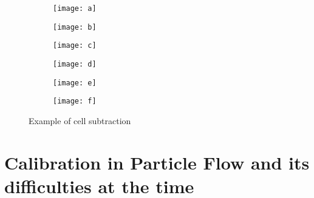\begin{figure}[htbp]
  \centering
  \begin{subfigure}[b]{0.3\figwidth}
    \texttt{[image: a]}
    \caption{}\label{fig:sub-a}
  \end{subfigure}
  \begin{subfigure}[b]{0.3\figwidth}
    \texttt{[image: b]}
    \caption{}\label{fig:sub-b}
  \end{subfigure}
  \begin{subfigure}[b]{0.3\figwidth}
    \texttt{[image: c]}
    \caption{}\label{fig:sub-c}
  \end{subfigure}
  \begin{subfigure}[b]{0.3\figwidth}
    \texttt{[image: d]}
    \caption{}\label{fig:sub-d}
  \end{subfigure}
    
    
  \begin{subfigure}[b]{0.3\figwidth}
        \texttt{[image: e]}
        \caption{}\label{fig:sub-e}
  \end{subfigure}
  \begin{subfigure}[b]{0.3\figwidth}
        \texttt{[image: f]}
        \caption{}\label{fig:sub-f}
  \end{subfigure}
  \caption{Example of cell subtraction \cite{pflowpaper}}
  \label{fig:sub}
\end{figure}






\section{Calibration in Particle Flow and its difficulties at the time}


